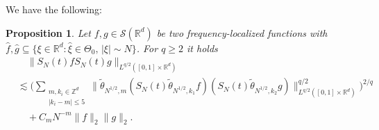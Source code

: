 \documentclass{amsart}
\numberwithin{equation}{section}
\newtheorem{proposition}[theorem]{Proposition}
\theoremstyle{definition}
\newcommand{\R}{\mathbb{R}}
\newcommand{\Z}{\mathbb{Z}}
\begin{document}
We have the following:
\begin{proposition}
\label{prop:BilinearSpatialLocalization}
    Let $f,g \in \mathcal{S}(\R^d)$ be two frequency-localized functions with $\hat{f}, \hat{g} \subseteq \{ \xi \in \R^d : \hat{\xi} \in \Theta_0, \, |\xi| \sim N\}$. For $q \geq 2$ it holds
    \begin{equation*}
    	\begin{split}
        &\quad \| S_N(t) f S_N(t) g \|_{L^{q/2}([0,1] \times \R^d)} \\
        &\lesssim \big( \sum_{ \substack{m, k_i \in \Z^d \\ |k_i-m| \leq 5}} \| \tilde{\theta}_{N^{1/2},m} ( S_N(t) \tilde{\theta}_{N^{1/2},k_1} f) (S_N(t) \tilde{\theta}_{N^{1/2},k_2} g) \|_{L^{q/2}([0,1] \times \R^d)}^{q/2} \big)^{2/q} \\
       &\quad + C_m N^{-m} \| f \|_2 \| g \|_2.
       \end{split}
    \end{equation*}
\end{proposition}
\end{document}

